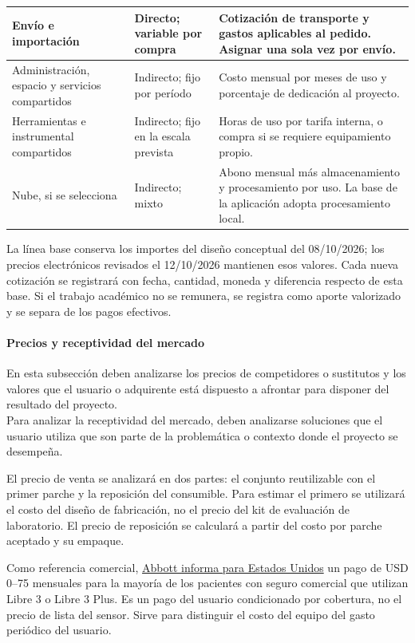 {\begin{xltabular}{\linewidth}{|>{\raggedright\arraybackslash}p{3.2cm}|>{\raggedright\arraybackslash}p{2.6cm}|>{\raggedright\arraybackslash}X|}
Envío e importación & Directo; variable por compra & Cotización de transporte y gastos aplicables al pedido. Asignar una sola vez por envío.\\\hline
Administración, espacio y servicios compartidos & Indirecto; fijo por período & Costo mensual por meses de uso y porcentaje de dedicación al proyecto.\\\hline
Herramientas e instrumental compartidos & Indirecto; fijo en la escala prevista & Horas de uso por tarifa interna, o compra si se requiere equipamiento propio.\\\hline
Nube, si se selecciona & Indirecto; mixto & Abono mensual más almacenamiento y procesamiento por uso. La base de la aplicación adopta procesamiento local.\\\hline
\end{xltabular}
}

La línea base conserva los importes del diseño conceptual del 08/10/2026; los precios electrónicos revisados el 12/10/2026 mantienen esos valores. Cada nueva cotización se registrará con fecha, cantidad, moneda y diferencia respecto de esta base. Si el trabajo académico no se remunera, se registra como aporte valorizado y se separa de los pagos efectivos.

\paragraph{Precios y receptividad del mercado}
    {\consigna
    En esta subsección deben analizarse los precios de competidores o sustitutos y los valores que el usuario o adquirente está dispuesto a afrontar para disponer del resultado del proyecto.\\
    Para analizar la receptividad del mercado, deben analizarse soluciones que el usuario utiliza que son parte de la problemática o contexto donde el proyecto se desempeña.
   }



El precio de venta se analizará en dos partes: el conjunto reutilizable con el primer parche y la reposición del consumible. Para estimar el primero se utilizará el costo del diseño de fabricación, no el precio del kit de evaluación de laboratorio. El precio de reposición se calculará a partir del costo por parche aceptado y su empaque.

Como referencia comercial, \href{https://www.support.freestyle.abbott/hc/en-us/articles/14795283859991-How-much-does-the-FreeStyle-Libre-3-system-cost}{Abbott informa para Estados Unidos} un pago de USD 0--75 mensuales para la mayoría de los pacientes con seguro comercial que utilizan Libre 3 o Libre 3 Plus. Es un pago del usuario condicionado por cobertura, no el precio de lista del sensor. Sirve para distinguir el costo del equipo del gasto periódico del usuario.

